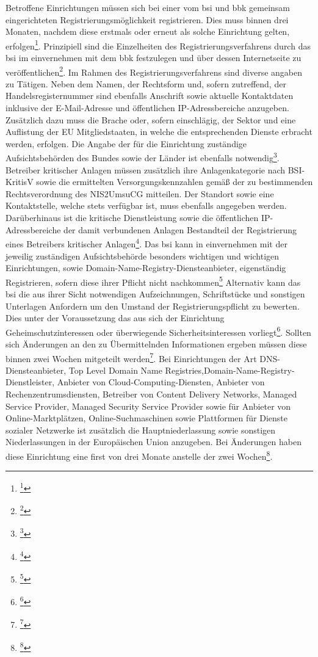 \documentclass[11pt,a4paper,hidelinks]{article}   %
\begin{document}
        Betroffene Einrichtungen müssen sich bei einer vom \gls{bsi} und \gls{bbk} gemeinsam eingerichteten Registrierungsmöglichkeit registrieren. Dies muss binnen drei Monaten, nachdem diese erstmals oder erneut als solche Einrichtung gelten, erfolgen\footnote{\footcite[Vgl.][, §33, Absatz 1]{NIS2UmsuCG}}. Prinzipiell sind die Einzelheiten des Registrierungsverfahrens durch das \gls{bsi} im einvernehmen mit dem \gls{bbk} festzulegen und über dessen Internetseite zu veröffentlichen\footnote{\footcite[Vgl.][, §33, Absatz 6]{NIS2UmsuCG}}. Im Rahmen des Registrierungsverfahrens sind diverse angaben zu Tätigen. Neben dem Namen, der Rechtsform und, sofern zutreffend, der Handelsregisternummer sind ebenfalls Anschrift sowie aktuelle Kontaktdaten inklusive der E-Mail-Adresse und öffentlichen IP-Adressbereiche anzugeben. Zusätzlich dazu muss die Brache oder, sofern einschlägig, der Sektor und eine Auflistung der EU Mitgliedstaaten, in welche die entsprechenden Dienste erbracht werden, erfolgen. Die Angabe der für die Einrichtung zuständige Aufsichtsbehörden des Bundes sowie der Länder ist ebenfalls notwendig\footnote{\footcite[Vgl.][, §33, Absatz 1]{NIS2UmsuCG}}. Betreiber kritischer Anlagen müssen zusätzlich ihre Anlagenkategorie nach BSI-KritisV sowie die ermittelten Versorgungskennzahlen gemäß der zu bestimmenden Rechtsverordnung des NIS2UmsuCG mitteilen. Der Standort sowie eine Kontaktstelle, welche stets verfügbar ist, muss ebenfalls angegeben werden. Darüberhinaus ist die kritische Dienstleistung sowie die öffentlichen IP-Adressbereiche der damit verbundenen Anlagen Bestandteil der Registrierung eines Betreibers kritischer Anlagen\footnote{\footcite[Vgl.][, §33, Absatz 1]{NIS2UmsuCG}}. Das \gls{bsi} kann in einvernehmen mit der jeweilig zuständigen Aufsichtsbehörde besonders wichtigen und wichtigen Einrichtungen, sowie Domain-Name-Registry-Diensteanbieter, eigenständig Registrieren, sofern diese ihrer Pflicht nicht nachkommen\footnote{\footcite[Vgl.][, §33, Absatz 3]{NIS2UmsuCG}} Alternativ kann das \gls{bsi} die aus ihrer Sicht notwendigen Aufzeichnungen, Schriftstücke und sonstigen Unterlagen Anfordern um den Umstand der Registrierungspflicht zu bewerten. Dies unter der Voraussetzung das aus sich der Einrichtung Geheimschutzinteressen oder überwiegende Sicherheitsinteressen vorliegt\footnote{\footcite[Vgl.][, §33, Absatz 4]{NIS2UmsuCG}}. Sollten sich Änderungen an den zu Übermittelnden Informationen ergeben müssen diese binnen zwei Wochen mitgeteilt werden\footnote{\footcite[Vgl.][, §33, Absatz 5]{NIS2UmsuCG}}. Bei Einrichtungen der Art DNS-Diensteanbieter, Top Level Domain Name Registries,Domain-Name-Registry-Dienstleister, Anbieter von Cloud-Computing-Diensten, Anbieter von Rechenzentrumsdiensten, Betreiber von Content Delivery Networks, Managed Service Provider, Managed Security Service Provider sowie für Anbieter von Online-Marktplätzen, Online-Suchmaschinen sowie Plattformen für Dienste sozialer Netzwerke ist zusätzlich die Hauptniederlassung sowie sonstigen Niederlassungen in der Europäischen Union anzugeben. Bei Änderungen haben diese Einrichtung eine first von drei Monate anstelle der zwei Wochen\footnote{\footcite[Vgl.][, §34]{NIS2UmsuCG}}.\medbreak
\end{document}
